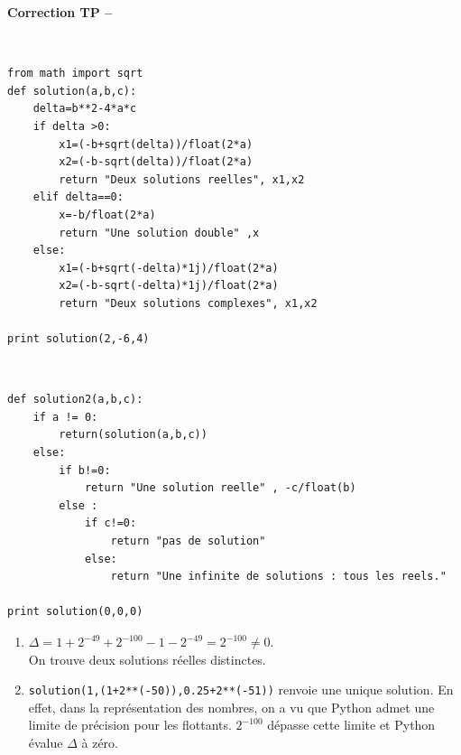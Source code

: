 \ifdef{\public}{}{}

\newpage 

\begin{center}
{\Large\bf Correction TP \no {\num} -- \descrip}
\end{center}



\begin{solution}~\\
\vspace*{-0.7cm}
\begin{verbatim}
from math import sqrt
def solution(a,b,c):
	delta=b**2-4*a*c
	if delta >0:
		x1=(-b+sqrt(delta))/float(2*a)
		x2=(-b-sqrt(delta))/float(2*a)
		return "Deux solutions reelles", x1,x2
	elif delta==0:
		x=-b/float(2*a)
		return "Une solution double" ,x
	else:
		x1=(-b+sqrt(-delta)*1j)/float(2*a)
		x2=(-b-sqrt(-delta)*1j)/float(2*a)
		return "Deux solutions complexes", x1,x2			
		
print solution(2,-6,4)		
\end{verbatim}
\end{solution}



\begin{solution}
~\\
\vspace*{-0.7cm}
\begin{verbatim}
def solution2(a,b,c):
	if a != 0:
		return(solution(a,b,c))
	else:
		if b!=0:
			return "Une solution reelle" , -c/float(b)
		else :
			if c!=0:
				return "pas de solution"
			else:
				return "Une infinite de solutions : tous les reels."	

print solution(0,0,0)								
\end{verbatim}
\end{solution}



\begin{solution}
\begin{enumerate}
\item $\Delta=1+2^{-49}+2^{-100}-1-2^{-49}=2^{-100}\neq 0$.\\
On trouve deux solutions r\' eelles distinctes.
\item \verb?solution(1,(1+2**(-50)),0.25+2**(-51))? renvoie une unique solution. En effet, dans la repr\' esentation des nombres, on a vu que Python admet une limite de pr\' ecision pour les flottants. $2^{-100}$ d\' epasse cette limite et Python \' evalue $\Delta$ \` a z\' ero.
\end{enumerate}
\end{solution}




